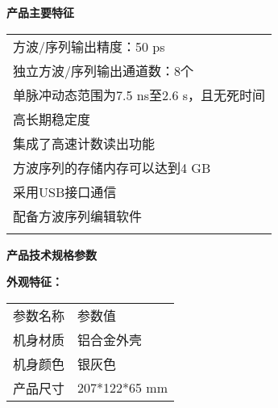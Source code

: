 \makeatletter
\def\hlinewd#1{%
  \noalign{\ifnum0=`}\fi\hrule \@height #1 \futurelet
   \reserved@a\@xhline}
\makeatother
\noindent\sanhao\textbf{产品主要特征}
\vspace{0.3cm}
\song
\begin{table}[H]
\normalsize
{}
\begin{tabular}{m{13.5cm}}
\rowcolor{gray!20}
\arrayrulecolor{tabcolor_top}\toprule[1.8pt]
方波/序列输出精度：50 ps\\\arrayrulecolor{tabcolor}\midrule[1.2pt]
独立方波/序列输出通道数：8个 \\\arrayrulecolor{tabcolor}\midrule[1.2pt]
单脉冲动态范围为7.5 ns至2.6 s，且无死时间\\\arrayrulecolor{tabcolor}\midrule[1.2pt]
高长期稳定度\\\arrayrulecolor{tabcolor}\midrule[1.2pt]
集成了高速计数读出功能\\\arrayrulecolor{tabcolor}\midrule[1.2pt]
方波序列的存储内存可以达到4 GB\\\arrayrulecolor{tabcolor}\midrule[1.2pt]
采用USB接口通信\\\arrayrulecolor{tabcolor}\midrule[1.2pt]
配备方波序列编辑软件\\
\arrayrulecolor{tabcolor_top}\bottomrule[1.8pt]
\end{tabular}
\end{table}


\newpage
\noindent\sanhao\textbf{产品技术规格参数}
\vspace{0.5cm}

\noindent\xiaosi\textbf{外观特征：}
\vspace{0.1cm}
\song
\begin{table}[H]
\normalsize
{}
\begin{tabular}{m{6.5cm}|m{6.5cm}}
\rowcolor{myblue}
\color{white}参数名称& \color{white}参数值\\\arrayrulecolor{tabcolor}\midrule[1.2pt]
机身材质& 铝合金外壳\\\arrayrulecolor{tabcolor}\midrule[1.2pt]
机身颜色& 银灰色\\\arrayrulecolor{tabcolor}\midrule[1.2pt]
产品尺寸& 207*122*65 mm\\
\end{tabular}
\end{table}



